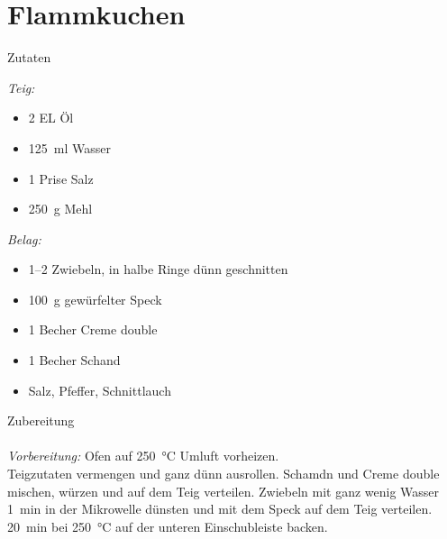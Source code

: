 \section*{Flammkuchen}
\ihead{}\ohead{}
\cfoot{}
{\Large Zutaten}
\begin{multicols}{2}
\textit{Teig:}
\begin{itemize}
    \item \num{2} EL Öl
    \item \SI{125}{ml} Wasser
    \item \num{1} Prise Salz
    \item \SI{250}{g} Mehl
\end{itemize}
\columnbreak
\textit{Belag:}
\begin{itemize}
    \item \numrange{1}{2} Zwiebeln, in halbe Ringe dünn geschnitten
    \item \SI{100}{g} gewürfelter Speck
    \item \num{1} Becher Creme double
    \item \num{1} Becher Schand
    \item Salz, Pfeffer, Schnittlauch
\end{itemize}
\columnbreak
\end{multicols}
\noindent
{\Large Zubereitung}\\
\\
\textit{Vorbereitung:} Ofen auf \SI{250}{\celsius} Umluft vorheizen.\\
Teigzutaten vermengen und ganz dünn ausrollen.
Schamdn und Creme double mischen, würzen und auf dem Teig verteilen.
Zwiebeln mit ganz wenig Wasser \SI{1}{min} in der Mikrowelle dünsten und mit dem Speck auf dem Teig verteilen.
\SI{20}{min} bei \SI{250}{\celsius} auf der unteren Einschubleiste backen.